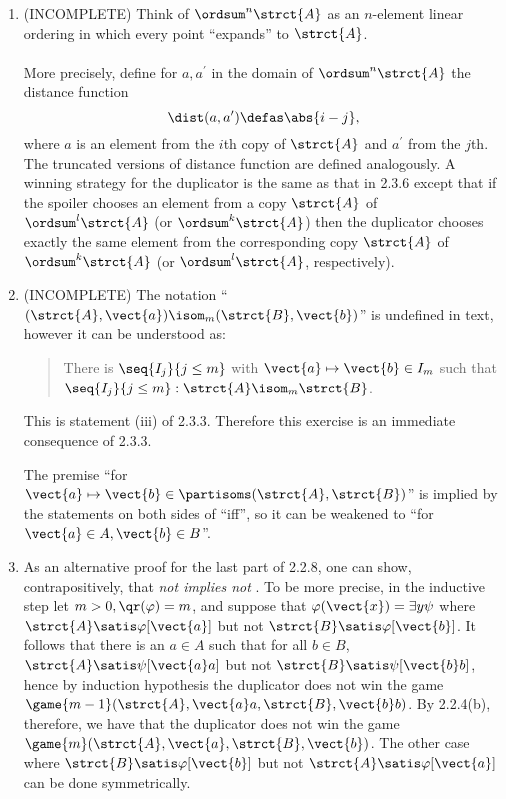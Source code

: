 \begin{enumerate}[1.]
%
\item {} (INCOMPLETE)
Think of $\ordsum^n \strct{A}$ as an $n$-element linear ordering in which every point ``expands'' to $\strct{A}$.\\
\medskip\\
More precisely, define for $a, a^\prime$ in the domain of $\ordsum^n \strct{A}$ the distance function
\[
\dist(a, a^\prime) \defas \abs{i - j},
\]
where $a$ is an element from the $i$th copy of $\strct{A}$ and $a^\prime$ from the $j$th. The truncated versions of distance function are defined analogously. A winning strategy for the duplicator is the same as that in 2.3.6 except that if the spoiler chooses an element from a copy $\strct{A}$ of $\ordsum^l \strct{A}$ (or $\ordsum^k \strct{A}$) then the duplicator chooses exactly the same element from the corresponding copy $\strct{A}$ of $\ordsum^k \strct{A}$ (or $\ordsum^l \strct{A}$, respectively).
%
\item {} (INCOMPLETE)
The notation ``$(\strct{A}, \vect{a}) \isom_m (\strct{B}, \vect{b})$'' is undefined in text, however it can be understood as:
\begin{quote}
There is $\seq{I_j}{j \leq m}$ with $\vect{a} \mapsto \vect{b} \in I_m$ such that $\seq{I_j}{j \leq m} : \strct{A} \isom_m \strct{B}$.
\end{quote}
This is statement (iii) of 2.3.3. Therefore this exercise is an immediate consequence of 2.3.3.
\begin{remark}
The premise ``for $\vect{a} \mapsto \vect{b} \in \partisoms(\strct{A}, \strct{B})$'' is implied by the statements on both sides of ``iff'', so it can be weakened to ``for $\vect{a} \in A, \vect{b} \in B$''.
\end{remark}
%
\item {} As an alternative proof for the last part of 2.2.8, one can show, contrapositively, that \emph{not  implies not }. To be more precise, in the inductive step let $m > 0, \qr(\varphi) = m$, and suppose that $\varphi(\vect{x}) = \exists y \psi$ where $\strct{A} \satis \varphi[\vect{a}]$ but not $\strct{B} \satis \varphi[\vect{b}]$. It follows that there is an $a \in A$ such that for all $b \in B$, $\strct{A} \satis \psi[\vect{a}a]$ but not $\strct{B} \satis \psi[\vect{b}b]$, hence by induction hypothesis the duplicator does not win the game $\game{m - 1}(\strct{A}, \vect{a}a, \strct{B}, \vect{b}b)$. By 2.2.4(b), therefore, we have that the duplicator does not win the game $\game{m}(\strct{A}, \vect{a}, \strct{B}, \vect{b})$. The other case where $\strct{B} \satis \varphi[\vect{b}]$ but not $\strct{A} \satis \varphi[\vect{a}]$ can be done symmetrically.

\end{enumerate}
